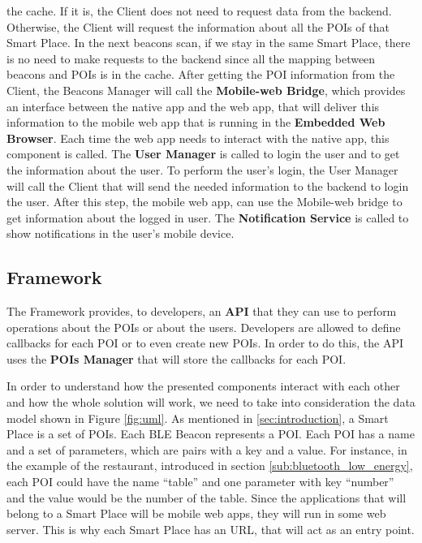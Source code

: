 the cache. If it is, the Client does not need to request
data from the backend. Otherwise, the Client will
request the information about all the POIs of that
Smart Place. In the next beacons scan, if we stay in
the same Smart Place, there is no need to make requests
to the backend since all the mapping between beacons
and POIs is in the cache.
After getting the POI information from the Client,
the Beacons Manager will call the \textbf{Mobile-web Bridge},
which provides an interface between the native app
and the web app, that will deliver this information
to the mobile web app that is running in the
\textbf{Embedded Web Browser}. 
Each time the web app needs to interact
with the native app, this component is called.
The \textbf{User Manager} is called to login the
user and to get the information about the user. 
To perform the user's login, the User Manager
will call the Client that will send the needed information
to the backend to login the user. After this step,
the mobile web app, can use the Mobile-web bridge
to get information about the logged in user.
The \textbf{Notification Service} is called to
show notifications in the user's mobile device.

\subsection{Framework}
\label{sub:framework}
The Framework provides, to developers, an \textbf{API} that they
can use to perform operations about the POIs or about the users.
Developers are allowed to define callbacks for each POI or to
even create new POIs. In order to do this, the API
uses the \textbf{POIs Manager} that will store the callbacks
for each POI.

In order to understand how the presented components
interact with each other and how the whole solution will
work, we need to take into consideration the data model
shown in Figure \ref{fig:uml}.
As mentioned in \ref{sec:introduction}, a Smart Place
is a set of POIs. Each BLE Beacon represents a POI.
Each POI has a name and a set of parameters, which are
pairs with a key and a value.
For instance, in the example of the restaurant,
introduced in section \ref{sub:bluetooth_low_energy},
each POI could have the name ``table'' and one 
parameter with key ``number'' and the value would
be the number of the table. Since the applications
that will belong to a Smart Place will be
mobile web apps, they will run in some web
server. This is why each Smart Place has an URL,
that will act as an entry point.

